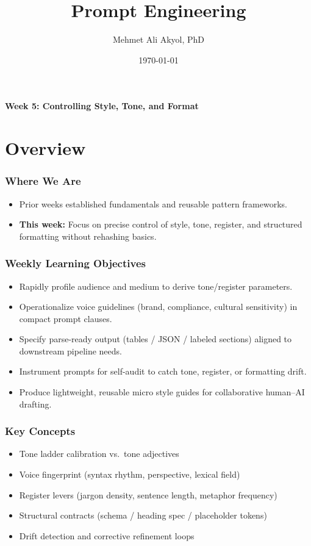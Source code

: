\documentclass{beamer}
\title{Prompt Engineering}
\author{Mehmet Ali Akyol, PhD}
\institute{Ankara Medipol University}
\date{\today}
\begin{document}
\begin{frame}
    \titlepage
    \begin{center}
        \vspace{1cm}
        \textbf{Week 5: Controlling Style, Tone, and Format}
    \end{center}
\end{frame}

\section{Overview}

\begin{frame}
    \frametitle{Where We Are}
    \begin{itemize}
        \item Prior weeks established fundamentals and reusable pattern frameworks.
        \item \textbf{This week:} Focus on precise control of style, tone, register, and structured formatting without rehashing basics.
    \end{itemize}
\end{frame}

\begin{frame}
    \frametitle{Weekly Learning Objectives}
    \begin{itemize}
        \item Rapidly profile audience and medium to derive tone/register parameters.
        \item Operationalize voice guidelines (brand, compliance, cultural sensitivity) in compact prompt clauses.
        \item Specify parse-ready output (tables / JSON / labeled sections) aligned to downstream pipeline needs.
        \item Instrument prompts for self-audit to catch tone, register, or formatting drift.
        \item Produce lightweight, reusable micro style guides for collaborative human–AI drafting.
    \end{itemize}
\end{frame}

\begin{frame}
    \frametitle{Key Concepts}
    \begin{itemize}
        \item Tone ladder calibration vs.\ tone adjectives
        \item Voice fingerprint (syntax rhythm, perspective, lexical field)
        \item Register levers (jargon density, sentence length, metaphor frequency)
        \item Structural contracts (schema / heading spec / placeholder tokens)
        \item Drift detection and corrective refinement loops
    \end{itemize}
\end{frame}
\end{document}
